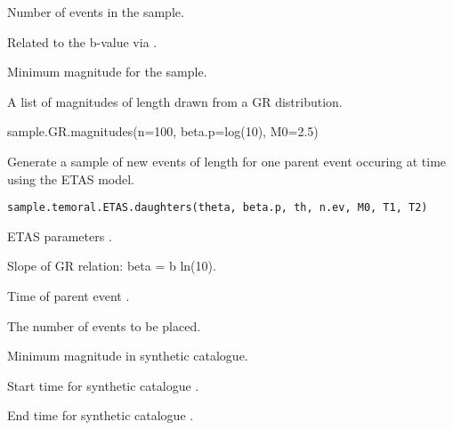 \documentclass[letterpaper]{book}
\begin{document}
%
\begin{Arguments}
\begin{ldescription}
\item[\code{n}] Number of events in the sample.

\item[\code{beta.p}] Related to the b-value via .

\item[\code{M0}] Minimum magnitude for the sample.
\end{ldescription}
\end{Arguments}
%
\begin{Value}
A list of magnitudes of length  drawn from a GR distribution.
\end{Value}
%
\begin{Examples}
\begin{ExampleCode}
sample.GR.magnitudes(n=100, beta.p=log(10), M0=2.5)
\end{ExampleCode}
\end{Examples}
%
\begin{Description}\relax
Generate a sample of new events  of length  for one parent event occuring at time  using the ETAS model.
\end{Description}
%
\begin{Usage}
\begin{verbatim}
sample.temoral.ETAS.daughters(theta, beta.p, th, n.ev, M0, T1, T2)
\end{verbatim}
\end{Usage}
%
\begin{Arguments}
\begin{ldescription}
\item[\code{theta}] ETAS parameters .

\item[\code{beta.p}] Slope of GR relation: beta = b ln(10).

\item[\code{th}] Time of parent event .

\item[\code{n.ev}] The number of events to be placed.

\item[\code{M0}] Minimum magnitude in synthetic catalogue.

\item[\code{T1}] Start time for synthetic catalogue .

\item[\code{T2}] End time for synthetic catalogue .
\end{ldescription}
\end{Arguments}
\end{document}
